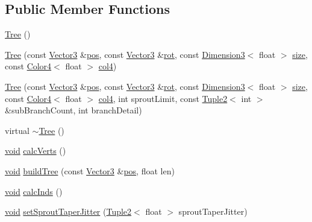 \subsection*{Public Member Functions}
\begin{DoxyCompactItemize}
\item 
\hyperlink{class_tree_ad376a7c639d857312f5de2ef47482f68}{Tree} ()
\item 
\hyperlink{class_tree_a0e6d9e18c96a1a4fc22e8085a6e442ec}{Tree} (const \hyperlink{class_vector3}{Vector3} \&\hyperlink{class_geom_base_ace2fc0557767dbb702aaf1655a85ed92}{pos}, const \hyperlink{class_vector3}{Vector3} \&\hyperlink{class_geom_base_a7de363bab1e976c73e495cf973a51de7}{rot}, const \hyperlink{class_dimension3}{Dimension3}$<$ float $>$ \hyperlink{gl3_8h_a79ef9eb3e59c4bb34c4b9fbeb8d28ff7}{size}, const \hyperlink{class_color4}{Color4}$<$ float $>$ \hyperlink{class_geom_base_acd58b67fcdac4428f66bea2c58c3aad8}{col4})
\item 
\hyperlink{class_tree_a6e95be26eea55b8519a7c2330bd91f9b}{Tree} (const \hyperlink{class_vector3}{Vector3} \&\hyperlink{class_geom_base_ace2fc0557767dbb702aaf1655a85ed92}{pos}, const \hyperlink{class_vector3}{Vector3} \&\hyperlink{class_geom_base_a7de363bab1e976c73e495cf973a51de7}{rot}, const \hyperlink{class_dimension3}{Dimension3}$<$ float $>$ \hyperlink{gl3_8h_a79ef9eb3e59c4bb34c4b9fbeb8d28ff7}{size}, const \hyperlink{class_color4}{Color4}$<$ float $>$ \hyperlink{class_geom_base_acd58b67fcdac4428f66bea2c58c3aad8}{col4}, int sprout\-Limit, const \hyperlink{class_tuple2}{Tuple2}$<$ int $>$ \&sub\-Branch\-Count, int branch\-Detail)
\item 
virtual \hyperlink{class_tree_abdc38545cf3f588725b5d8b8075b3866}{$\sim$\-Tree} ()
\item 
\hyperlink{glutf90_8h_ac778d6f63f1aaf8ebda0ce6ac821b56e}{void} \hyperlink{class_tree_a3fb4686854dabed151c413bce40875cd}{calc\-Verts} ()
\item 
\hyperlink{glutf90_8h_ac778d6f63f1aaf8ebda0ce6ac821b56e}{void} \hyperlink{class_tree_a7685c536c875deeecafb9da04ec5173b}{build\-Tree} (const \hyperlink{class_vector3}{Vector3} \&\hyperlink{class_geom_base_ace2fc0557767dbb702aaf1655a85ed92}{pos}, float len)
\item 
\hyperlink{glutf90_8h_ac778d6f63f1aaf8ebda0ce6ac821b56e}{void} \hyperlink{class_tree_a9a5187e7eb5f8820f0fb2498de13607d}{calc\-Inds} ()
\item 
\hyperlink{glutf90_8h_ac778d6f63f1aaf8ebda0ce6ac821b56e}{void} \hyperlink{class_tree_a31e90b11c7ff6012671d2ab8f4181147}{set\-Sprout\-Taper\-Jitter} (\hyperlink{class_tuple2}{Tuple2}$<$ float $>$ sprout\-Taper\-Jitter)

\end{DoxyCompactItemize}
